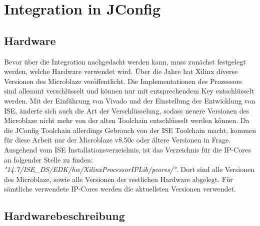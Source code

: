 \section{Integration in JConfig}
\subsection{Hardware}
Bevor über die Integration nachgedacht werden kann, muss zunächst festgelegt werden, welche Hardware verwendet wird. Über die Jahre hat Xilinx diverse Versionen des Microblaze veröffentlicht. Die Implementationen des Prozessors sind allesamt verschlüsselt und können nur mit entsprechendem Key entschlüsselt werden. Mit der Einführung von Vivado und der Einstellung der Entwicklung von ISE, änderte sich auch die Art der Verschlüsselung, sodass neuere Versionen des Microblaze nicht mehr von der alten Toolchain entschlüsselt werden können. Da die JConfig Toolchain allerdings Gebrauch von der ISE Toolchain macht, kommen für diese Arbeit nur der Microblaze v8.50c oder ältere Versionen in Frage.\\
Ausgehend vom ISE Installationsverzeichnis, ist das Verzeichnis für die IP-Cores an folgender Stelle zu finden: \textit{"14.7/ISE\_DS/EDK/hw/XilinxProcessorIPLib/pcores/"}. Dort sind alle Versionen des Microblaze, sowie alle Versionen der restlichen Hardware abgelegt. Für sämtliche verwendete IP-Cores werden die aktuellsten Versionen verwendet.
\subsection{Hardwarebeschreibung}
